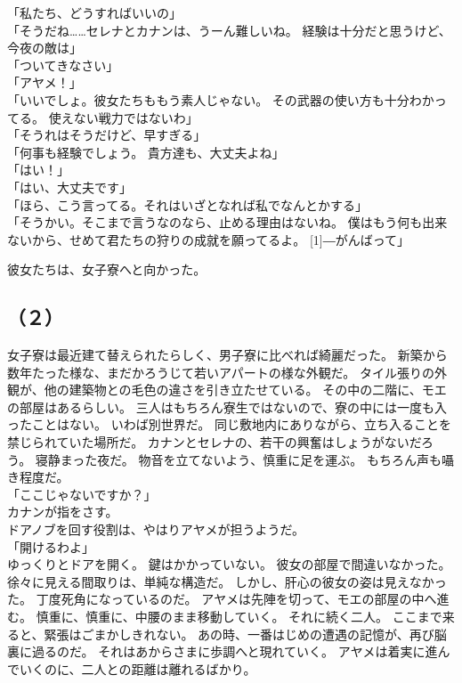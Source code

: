 \documentclass[../IHMain]{subfiles}
\begin{document}
「私たち、どうすればいいの」\\
「そうだね……セレナとカナンは、うーん難しいね。
経験は十分だと思うけど、今夜の敵は」\\
「ついてきなさい」\\
「アヤメ！」\\
「いいでしょ。彼女たちももう素人じゃない。
その武器の使い方も十分わかってる。
使えない戦力ではないわ」\\
「そうれはそうだけど、早すぎる」\\
「何事も経験でしょう。
貴方達も、大丈夫よね」\\
「はい！」\\
「はい、大丈夫です」\\
「ほら、こう言ってる。それはいざとなれば私でなんとかする」\\
「そうかい。そこまで言うなのなら、止める理由はないね。
僕はもう何も出来ないから、せめて君たちの狩りの成就を願ってるよ。
\scalebox{3}[1]{―}がんばって」

彼女たちは、女子寮へと向かった。

\subsection*{（２）}
女子寮は最近建て替えられたらしく、男子寮に比べれば綺麗だった。
新築から数年たった様な、まだかろうじて若いアパートの様な外観だ。
タイル張りの外観が、他の建築物との毛色の違さを引き立たせている。
その中の二階に、モエの部屋はあるらしい。
三人はもちろん寮生ではないので、寮の中には一度も入ったことはない。
いわば別世界だ。
同じ敷地内にありながら、立ち入ることを禁じられていた場所だ。
カナンとセレナの、若干の興奮はしょうがないだろう。
寝静まった夜だ。
物音を立てないよう、慎重に足を運ぶ。
もちろん声も囁き程度だ。\\
「ここじゃないですか？」\\
カナンが指をさす。\\
ドアノブを回す役割は、やはりアヤメが担うようだ。\\
「開けるわよ」\\
ゆっくりとドアを開く。
鍵はかかっていない。
彼女の部屋で間違いなかった。
徐々に見える間取りは、単純な構造だ。
しかし、肝心の彼女の姿は見えなかった。
丁度死角になっているのだ。
アヤメは先陣を切って、モエの部屋の中へ進む。
慎重に、慎重に、中腰のまま移動していく。
それに続く二人。
ここまで来ると、緊張はごまかしきれない。
あの時、一番はじめの遭遇の記憶が、再び脳裏に過るのだ。
それはあからさまに歩調へと現れていく。
アヤメは着実に進んでいくのに、二人との距離は離れるばかり。\\
\end{document}
